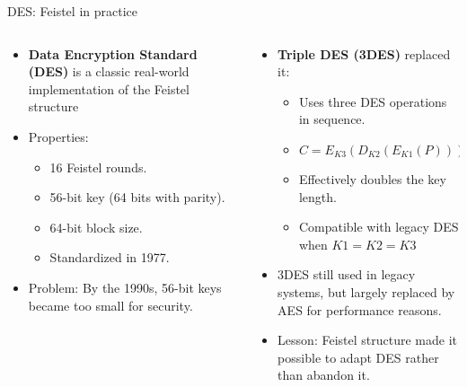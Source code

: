 \documentclass[aspectratio=169, lualatex, handout]{beamer}
\begin{document}
\begin{frame}{DES: Feistel in practice}
	\begin{columns}[c]
		\begin{column}{0.5\textwidth}
			\begin{itemize}[<+->]
				\item \textbf{Data Encryption Standard (DES)} is a classic real-world implementation of the Feistel structure
				\item Properties:
				      \begin{itemize}
					      \item 16 Feistel rounds.
					      \item 56-bit key (64 bits with parity).
					      \item 64-bit block size.
					      \item Standardized in 1977.
				      \end{itemize}
				\item Problem: By the 1990s, 56-bit keys became too small for security.
			\end{itemize}
		\end{column}
		\begin{column}{0.5\textwidth}
			\begin{itemize}[<+->]
				\item \textbf{Triple DES (3DES)} replaced it:
				      \begin{itemize}
					      \item Uses three DES operations in sequence.
					      \item $C = E_{K3}(D_{K2}(E_{K1}(P)))$
					      \item Effectively doubles the key length.
					      \item Compatible with legacy DES when $K1 = K2 = K3$
				      \end{itemize}
				\item 3DES still used in legacy systems, but largely replaced by AES for performance reasons.
				\item Lesson: Feistel structure made it possible to adapt DES rather than abandon it.
			\end{itemize}
		\end{column}
	\end{columns}
\end{frame}
\end{document}
